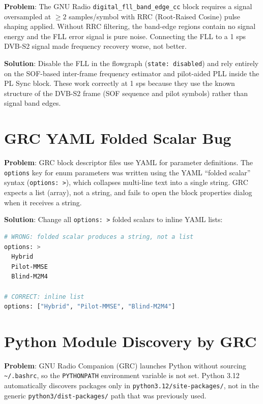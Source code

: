\documentclass[12pt,a4paper]{report}
\begin{document}
\textbf{Problem}: The GNU Radio \texttt{digital\_fll\_band\_edge\_cc} block
requires a signal oversampled at $\geq 2$ samples/symbol with RRC (Root-Raised
Cosine) pulse shaping applied. Without RRC filtering, the band-edge regions
contain no signal energy and the FLL error signal is pure noise. Connecting the
FLL to a 1 sps DVB-S2 signal made frequency recovery worse, not better.

\textbf{Solution}: Disable the FLL in the flowgraph (\texttt{state: disabled})
and rely entirely on the SOF-based inter-frame frequency estimator and
pilot-aided PLL inside the PL Sync block. These work correctly at 1 sps
because they use the known structure of the DVB-S2 frame (SOF sequence and
pilot symbols) rather than signal band edges.

\section{GRC YAML Folded Scalar Bug}

\textbf{Problem}: GRC block descriptor files use YAML for parameter
definitions. The \texttt{options} key for enum parameters was written using
the YAML ``folded scalar'' syntax (\texttt{options: >}), which collapses
multi-line text into a single string. GRC expects a list (array), not a string,
and fails to open the block properties dialog when it receives a string.

\textbf{Solution}: Change all \texttt{options: >} folded scalars to inline YAML
lists:
\begin{lstlisting}[language=bash, caption={Correct YAML list syntax for GRC enum options}]
# WRONG: folded scalar produces a string, not a list
options: >
  Hybrid
  Pilot-MMSE
  Blind-M2M4

# CORRECT: inline list
options: ["Hybrid", "Pilot-MMSE", "Blind-M2M4"]
\end{lstlisting}

\section{Python Module Discovery by GRC}

\textbf{Problem}: GNU Radio Companion (GRC) launches Python without sourcing
\texttt{\textasciitilde/.bashrc}, so the \texttt{PYTHONPATH} environment
variable is not set. Python 3.12 automatically discovers packages only in
\texttt{python3.12/site-packages/}, not in the generic
\texttt{python3/dist-packages/} path that was previously used.
\end{document}
